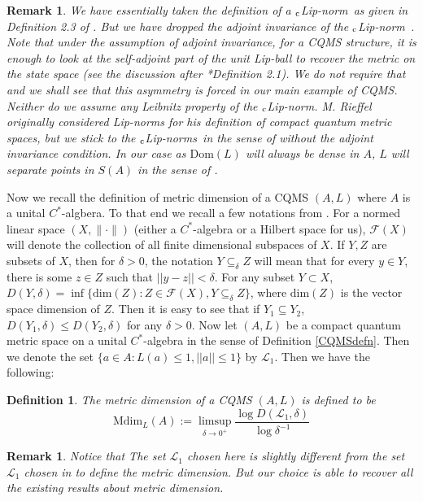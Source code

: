 \documentclass[a4paper,11pt,reqno]{amsart}
\theoremstyle{plain}
\newtheorem{defn}[thm]{Definition}
\newtheorem{rem}[thm]{Remark}
\theoremstyle{mainthmstyle}
\theoremstyle{named}
\numberwithin{equation}{section}
\newcommand{\clipnorm}{$_{\text{\rm c}}$Lip-norm}
\newcommand{\clipnorms}{$_{\text{\rm c}}$Lip-norms}
\begin{document}
\begin{rem}
    We have essentially taken the definition of a \clipnorm\ as given in Definition 2.3 of \cite{Kerr}. But we have dropped the adjoint invariance of the \clipnorm\ . Note that under the assumption of adjoint invariance, for a CQMS structure, it is enough to look at the self-adjoint part of the unit Lip-ball to recover the metric on the state space (see the discussion after \cite{Kerr}*{Definition 2.1}). We do not require that and we shall see that this asymmetry is forced in our main example of CQMS. Neither do we assume any Leibnitz property of the $_{\text{\rm c}}$Lip-norm. M. Rieffel originally considered Lip-norms for his definition of compact quantum metric spaces, but we stick to the \clipnorms\ in the sense of \cite{Kerr} without the adjoint invariance condition. In our case as $\mathrm{Dom}(L)$ will always be dense in $A$, $L$ will separate points in $S(A)$ in the sense of \cite{Kerr}. 
\end{rem}
Now we recall the definition of metric dimension of a CQMS $(A,L)$ where $A$ is a unital $C^{\ast}$-algbera. To that end we recall a few notations from \cite{Kerr}. For a normed linear space $(X,\| \cdot \|)$ (either a $C^{\ast}$-algebra or a Hilbert space for us), $\mathcal{F}(X)$ will denote the collection of all finite dimensional subspaces of $X$. If $Y,Z$ are subsets of $X$, then for $\delta>0$, the notation $Y\subseteq_{\delta} Z$ will mean that for every $y\in Y$, there is some $z\in Z$ such that $\lvert\lvert y-z\rvert\rvert<\delta$. For any subset $Y\subset X$, $D(Y,\delta)=\inf\{{\textrm{dim}}(Z):Z\in\mathcal{F}(X), Y\subseteq_{\delta}Z\}$, where $\textrm{dim}(Z)$ is the vector space dimension of $Z$. Then it is easy to see that if $Y_{1}\subseteq Y_{2}$, $D(Y_{1},\delta)\leq D(Y_{2},\delta)$ for any $\delta>0$. Now let $(A,L)$ be a compact quantum metric space on a unital $C^{\ast}$-algebra in the sense of Definition \ref{CQMSdefn}. Then we denote the set $\{a\in A:L(a)\leq 1, \lvert\lvert a\rvert\rvert\leq 1\}$ by $\mathcal{L}_1$. Then we have the following:
\begin{defn}
    The metric dimension of a CQMS $(A,L)$ is defined to be
    \begin{displaymath}
    \mathrm{Mdim}_{L}(A):=\limsup\limits_{\delta\to 0^{+}} \frac{\log D(\mathcal{L}_{1},\delta)}{\log  \delta^{-1}}
    \end{displaymath}
\end{defn}
\begin{rem}
     Notice that The set $\mathcal{L}_{1}$ chosen here is slightly different from the set $\mathcal{L}_1$ chosen in \cite{Kerr} to define the metric dimension. But our choice is able to recover all the existing results about metric dimension. 
\end{rem}
\end{document}
